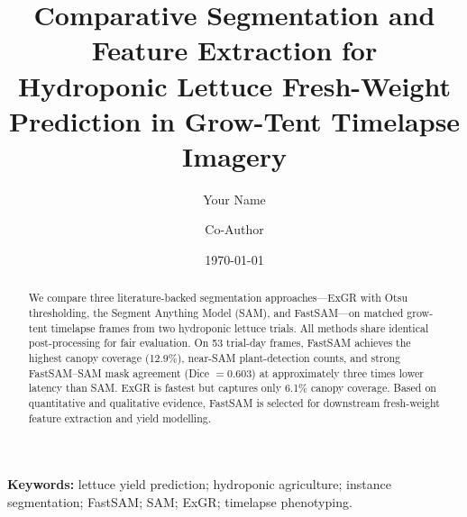 \documentclass[11pt,a4paper,twocolumn]{article}
\title{Comparative Segmentation and Feature Extraction for\\
Hydroponic Lettuce Fresh-Weight Prediction in Grow-Tent Timelapse Imagery}
\author[1]{Your Name}
\author[1]{Co-Author}
\affil[1]{Department, University, Country}
\date{\today}
\begin{document}
\maketitle

\begin{abstract}
We compare three literature-backed segmentation approaches---ExGR with Otsu
thresholding, the Segment Anything Model (SAM), and FastSAM---on matched
grow-tent timelapse frames from two hydroponic lettuce trials. All methods share
identical post-processing for fair evaluation. On 53 trial-day frames,
FastSAM achieves the highest canopy coverage (12.9\%), near-SAM plant-detection
counts, and strong FastSAM--SAM mask agreement (Dice $= 0.603$) at approximately
three times lower latency than SAM. ExGR is fastest but captures only 6.1\%
canopy coverage. Based on quantitative and qualitative evidence, FastSAM is
selected for downstream fresh-weight feature extraction and yield modelling.
\end{abstract}

\noindent\textbf{Keywords:} lettuce yield prediction; hydroponic agriculture;
instance segmentation; FastSAM; SAM; ExGR; timelapse phenotyping.





\end{document}
